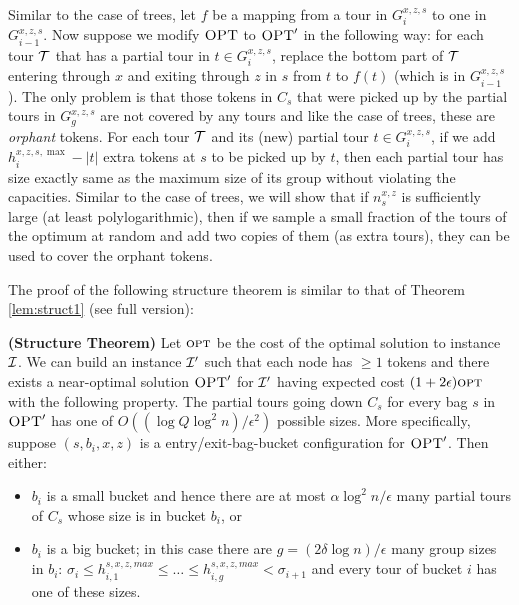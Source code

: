 \documentclass[twoside,leqno]{article}
\newcommand{\calI}{{\cal I}}
\newcommand{\calT}{{\cal T}}
\newcommand{\opt}{\mbox{\sc opt}}
\newcommand{\OPT}{\mbox{\sc OPT}}
\newcommand{\eps}{\epsilon}
\begin{document}
Similar to the case of trees, let $f$ be a mapping from a tour in $G_i^{x,z,s}$ to one in $G_{i-1}^{x,z,s}$. Now suppose we modify $\OPT$ to $\OPT'$ in the following way: for each tour $\calT$ that has a partial tour in $t \in G_i^{x,z,s}$, replace the bottom part of $\calT$ entering through $x$ and exiting through $z$ in $s$ from $t$ to $f(t)$ (which is in $G_{i-1}^{x,z,s}$). The only problem is that those tokens in $C_s$ that were picked up by the partial tours in $G_g^{x,z,s}$ are not covered by any tours and like the case of trees, these are \emph{orphant} tokens. For each tour $\calT$ and its (new) partial tour $t \in G_i^{x,z,s}$, if we add $h_i^{{x,z,s}, \max} - |t|$ extra tokens at $s$ to be picked up by $t$, then each partial tour has size exactly same as the maximum size of its group without violating the capacities. 
Similar to the case of trees, we will show that if $n_{s}^{x,z}$ is sufficiently large (at least polylogarithmic), then if we sample a small fraction of the tours of the optimum at random and add two copies of them (as extra tours), they can be used to cover the orphant tokens. 

The proof of the following structure theorem is similar to that of Theorem \ref{lem:struct1} (see full version):


\begin{theorem}\label{lem:struct2} \textbf{(Structure Theorem)}
Let $\opt$ be the cost of the optimal solution to instance $\calI$. We can build an instance $\calI'$
such that each node has $\geq 1$ tokens and there exists a near-optimal solution $\OPT'$ for $\calI'$
having expected cost $(1 + 2\eps)\opt$ with the following property.
The partial tours going down $C_s$ for every bag $s$ in $\OPT'$ has one of $O((\log Q \log^2 n)/\eps^2)$ possible sizes.
More specifically, suppose $(s,b_i,x,z)$ is a entry/exit-bag-bucket configuration for $\OPT'$. Then either:
\begin{itemize}
\item $b_i$ is a small bucket and hence there are at most $\alpha \log^2 n/\eps$ many partial tours of $C_s$ whose size is in bucket $b_i$, or
\item $b_i$ is a big bucket; in this case there are $g = (2\delta \log n)/\eps $ many group sizes in $b_i$: 
$\sigma_i \leq h_{i,1}^{s,x,z,max}\leq \ldots\leq h_{i,g}^{s,x,z,max}<\sigma_{i+1}$ and every tour of bucket $i$ has one of these sizes. 
\end{itemize}
\end{theorem}
\end{document}
